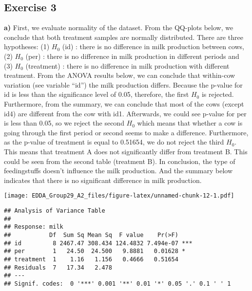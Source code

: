 \documentclass[]{article}
\begin{document}
\hypertarget{exercise-3}{%
\subsection{Exercise 3}\label{exercise-3}}

\textbf{a)} First, we evaluate normality of the dataset. From the
QQ-plots below, we conclude that both treatment samples are normally
distributed. There are three hypotheses: (1) \(H_0\) (id) : there is no
difference in milk production between cows, (2) \(H_0\) (per) : there is
no difference in milk production in different periods and (3) \(H_0\)
(treatment) : there is no difference in milk production with different
treatment. From the ANOVA results below, we can conclude that within-cow
variation (see variable ``id'') the milk production differs. Because the
p-value for id is less than the significance level of 0.05, therefore,
the first \(H_0\) is rejected. Furthermore, from the summary, we can
conclude that most of the cows (except id4) are different from the cow
with id1. Afterwards, we could see p-value for per is less than 0.05, so
we reject the second \(H_0\) which means that whether a cow is going
through the first period or second seems to make a difference.
Furthermore, as the p-value of treatment is equal to 0.51654, we do not
reject the third \(H_0\). This means that treatment A does not
significantly differ from treatment B. This could be seen from the
second table (treatment B). In conclusion, the type of feedingstuffs
doesn't influence the milk production. And the summary below indicates
that there is no significant difference in milk production.

\texttt{[image: EDDA\_Group29\_A2\_files/figure-latex/unnamed-chunk-12-1.pdf]}

\begin{verbatim}
## Analysis of Variance Table
## 
## Response: milk
##           Df  Sum Sq Mean Sq  F value    Pr(>F)    
## id         8 2467.47 308.434 124.4832 7.494e-07 ***
## per        1   24.50  24.500   9.8881   0.01628 *  
## treatment  1    1.16   1.156   0.4666   0.51654    
## Residuals  7   17.34   2.478                       
## ---
## Signif. codes:  0 '***' 0.001 '**' 0.01 '*' 0.05 '.' 0.1 ' ' 1
\end{verbatim}
\end{document}
